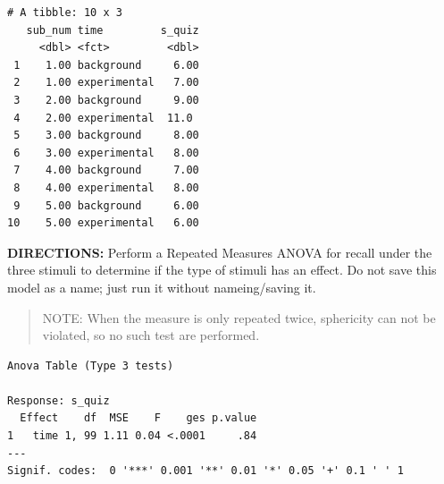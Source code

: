 \documentclass[]{article}
\newenvironment{Shaded}{\begin{snugshade}}{\end{snugshade}}
\newcommand{\KeywordTok}[1]{\textcolor[rgb]{0.13,0.29,0.53}{\textbf{#1}}}
\newcommand{\DataTypeTok}[1]{\textcolor[rgb]{0.13,0.29,0.53}{#1}}
\newcommand{\DecValTok}[1]{\textcolor[rgb]{0.00,0.00,0.81}{#1}}
\newcommand{\StringTok}[1]{\textcolor[rgb]{0.31,0.60,0.02}{#1}}
\newcommand{\CommentTok}[1]{\textcolor[rgb]{0.56,0.35,0.01}{\textit{#1}}}
\newcommand{\OperatorTok}[1]{\textcolor[rgb]{0.81,0.36,0.00}{\textbf{#1}}}
\newcommand{\NormalTok}[1]{#1}
\begin{document}
\begin{Shaded}
\end{Shaded}

\begin{verbatim}
# A tibble: 10 x 3
   sub_num time         s_quiz
     <dbl> <fct>         <dbl>
 1    1.00 background     6.00
 2    1.00 experimental   7.00
 3    2.00 background     9.00
 4    2.00 experimental  11.0 
 5    3.00 background     8.00
 6    3.00 experimental   8.00
 7    4.00 background     7.00
 8    4.00 experimental   8.00
 9    5.00 background     6.00
10    5.00 experimental   6.00
\end{verbatim}

\clearpage

\textbf{DIRECTIONS:} Perform a Repeated Measures ANOVA for recall under
the three stimuli to determine if the type of stimuli has an effect. Do
not save this model as a name; just run it without nameing/saving it.

\begin{quote}
NOTE: When the measure is only repeated twice, sphericity can not be
violated, so no such test are performed.
\end{quote}

\begin{Shaded}
\end{Shaded}

\begin{verbatim}
Anova Table (Type 3 tests)

Response: s_quiz
  Effect    df  MSE    F    ges p.value
1   time 1, 99 1.11 0.04 <.0001     .84
---
Signif. codes:  0 '***' 0.001 '**' 0.01 '*' 0.05 '+' 0.1 ' ' 1
\end{verbatim}
\end{document}
